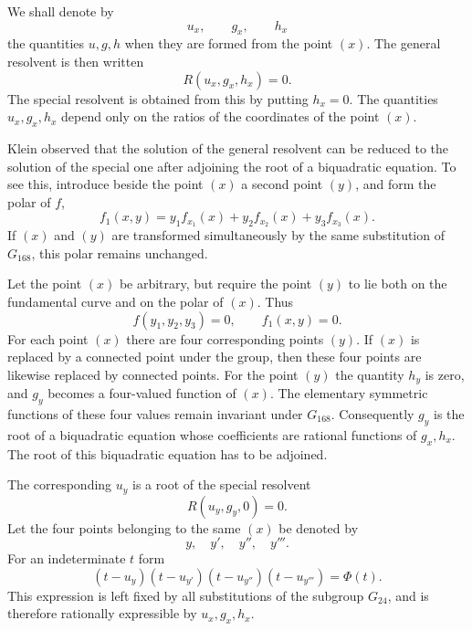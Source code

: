 \documentclass[11pt,a4paper]{book}
\begin{document}
We shall denote by
\[
 u_x,
\qquad g_x,
\qquad h_x
\]
the quantities \(u,g,h\) when they are formed from the point \((x)\).  The general resolvent is then written
\begin{equation}
 R(u_x,g_x,h_x)=0. \tag{1}
\end{equation}
The special resolvent is obtained from this by putting \(h_x=0\).  The quantities \(u_x,g_x,h_x\) depend only on the ratios of the coordinates of the point \((x)\).

Klein observed that the solution of the general resolvent can be reduced to the solution of the special one after adjoining the root of a biquadratic equation.  To see this, introduce beside the point \((x)\) a second point \((y)\), and form the polar of \(f\),
\begin{equation}
 f_1(x,y)=y_1f_{x_1}(x)+y_2f_{x_2}(x)+y_3f_{x_3}(x). \tag{2}
\end{equation}
If \((x)\) and \((y)\) are transformed simultaneously by the same substitution of \(G_{168}\), this polar remains unchanged.

Let the point \((x)\) be arbitrary, but require the point \((y)\) to lie both on the fundamental curve and on the polar of \((x)\).  Thus
\begin{equation}
 f(y_1,y_2,y_3)=0,
\qquad f_1(x,y)=0. \tag{3}
\end{equation}
For each point \((x)\) there are four corresponding points \((y)\).  If \((x)\) is replaced by a connected point under the group, then these four points are likewise replaced by connected points.  For the point \((y)\) the quantity \(h_y\) is zero, and \(g_y\) becomes a four-valued function of \((x)\).  The elementary symmetric functions of these four values remain invariant under \(G_{168}\).  Consequently \(g_y\) is the root of a biquadratic equation whose coefficients are rational functions of \(g_x,h_x\).  The root of this biquadratic equation has to be adjoined.

The corresponding \(u_y\) is a root of the special resolvent
\begin{equation}
 R(u_y,g_y,0)=0. \tag{4}
\end{equation}
Let the four points belonging to the same \((x)\) be denoted by
\[
 y,
\quad y',
\quad y'',
\quad y'''.
\]
For an indeterminate \(t\) form
\begin{equation}
 (t-u_y)(t-u_{y'})(t-u_{y''})(t-u_{y'''})=\Phi(t). \tag{5}
\end{equation}
This expression is left fixed by all substitutions of the subgroup \(G_{24}\), and is therefore rationally expressible by \(u_x,g_x,h_x\).
\end{document}
